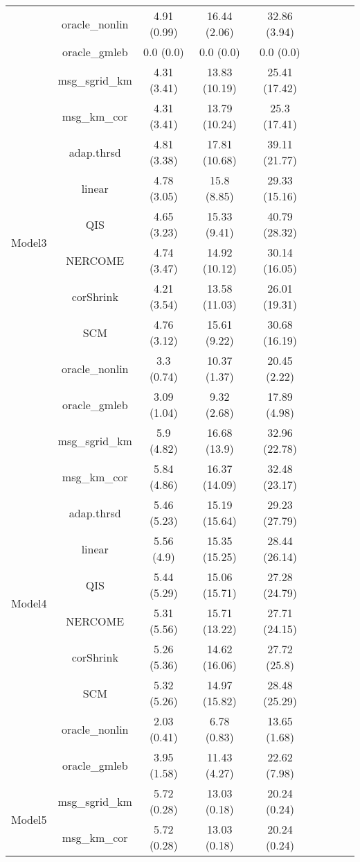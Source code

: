 \documentclass[useAMS,referee,usenatbib]{biom}
\begin{document}
\begin{table}[H]
{\begin{tabular}{ccccccccc}
&oracle\_nonlin & 4.91 (0.99)  & 16.44 (2.06)  & 32.86 (3.94)   \\
&oracle\_gmleb  & 0.0 (0.0)    & 0.0 (0.0)     & 0.0 (0.0) \\ \midrule
\multirow{10}{*}{Model3}    
&msg\_sgrid\_km & 4.31 (3.41) & 13.83 (10.19) & 25.41 (17.42) \\
&msg\_km\_cor   & 4.31 (3.41) & 13.79 (10.24) & 25.3 (17.41)  \\
&adap.thrsd     & 4.81 (3.38) & 17.81 (10.68) & 39.11 (21.77) \\
&linear         & 4.78 (3.05) & 15.8 (8.85)   & 29.33 (15.16) \\
&QIS            & 4.65 (3.23) & 15.33 (9.41)  & 40.79 (28.32) \\
&NERCOME        & 4.74 (3.47) & 14.92 (10.12) & 30.14 (16.05) \\
&corShrink      & 4.21 (3.54) & 13.58 (11.03) & 26.01 (19.31) \\
&SCM            & 4.76 (3.12) & 15.61 (9.22)  & 30.68 (16.19) \\
&oracle\_nonlin & 3.3 (0.74)  & 10.37 (1.37)  & 20.45 (2.22)  \\
&oracle\_gmleb  & 3.09 (1.04) & 9.32 (2.68)   & 17.89 (4.98) \\  \midrule
\multirow{10}{*}{Model4}    
&msg\_sgrid\_km & 5.9 (4.82)  & 16.68 (13.9)  & 32.96 (22.78) \\
&msg\_km\_cor   & 5.84 (4.86) & 16.37 (14.09) & 32.48 (23.17) \\
&adap.thrsd     & 5.46 (5.23) & 15.19 (15.64) & 29.23 (27.79) \\
&linear         & 5.56 (4.9)  & 15.35 (15.25) & 28.44 (26.14) \\
&QIS            & 5.44 (5.29) & 15.06 (15.71) & 27.28 (24.79) \\
&NERCOME        & 5.31 (5.56) & 15.71 (13.22) & 27.71 (24.15) \\
&corShrink      & 5.26 (5.36) & 14.62 (16.06) & 27.72 (25.8)  \\
&SCM            & 5.32 (5.26) & 14.97 (15.82) & 28.48 (25.29) \\
&oracle\_nonlin & 2.03 (0.41) & 6.78 (0.83)   & 13.65 (1.68)  \\
&oracle\_gmleb  & 3.95 (1.58) & 11.43 (4.27)  & 22.62 (7.98) \\ \midrule
\multirow{10}{*}{Model5}  
&msg\_sgrid\_km & 5.72 (0.28) & 13.03 (0.18) & 20.24 (0.24) \\
&msg\_km\_cor   & 5.72 (0.28) & 13.03 (0.18) & 20.24 (0.24) \\

\end{tabular}}
\end{table}
\end{document}
